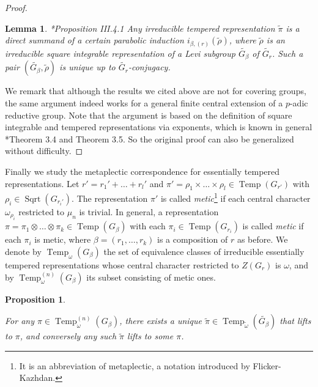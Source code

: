 \documentclass{amsart}
\numberwithin{equation}{section}
\newtheorem{proposition}[theorem]{\bf{Proposition}}
\newtheorem{lemma}[theorem]{\bf{Lemma}}
\newcommand{\mrsqrt}{\operatorname{Sqrt}}
\newcommand{\mrtemp}{\operatorname{Temp}}
\newcommand{\wt}[1]{\widetilde{#1}}
\begin{document}
\begin{proof}
		\begin{lemma}\cite{waldspurger2003formule}*{Proposition III.4.1} Any irreducible tempered representation $\wt{\pi}$ is a direct summand of a certain parabolic induction $i_{\beta,(r)}(\wt{\rho})$, where $\wt{\rho}$ is an irreducible square integrable representation of a Levi subgroup $\wt{G_{\beta}}$ of $\wt{G_{r}}$. Such a pair $(\wt{G_{\beta}},\wt{\rho})$ is unique up to $\wt{G_{r}}$-conjugacy.
			
		\end{lemma}
		
		We remark that although the results we cited above are not for covering groups, the same argument indeed works for a general finite central extension of a $p$-adic reductive group. Note that the argument is based on the definition of square integrable and tempered representations via exponents, which is known in general \cite{ban2013langlands}*{Theorem 3.4 and Theorem 3.5}. So the original proof can also be generalized without difficulty.
		
		
		
		
	\end{proof}
	
	Finally we study the metaplectic correspondence for essentially tempered representations. Let  $r'=r_{1}'+\dots+r_{l}'$ and  $\pi'=\rho_{1}\times\dots\times\rho_{l}\in\mrtemp(G_{r'})$ with $\rho_{i}\in\mrsqrt(G_{r_{i}'})$. The representation $\pi'$ is called \emph{metic}\footnote{It is an abbreviation of metaplectic, a notation introduced by Flicker-Kazhdan.} if each central character $\omega_{\rho_{i}}$ restricted to $\mu_{n}$ is trivial. In general, a representation $\pi=\pi_{1}\otimes\dots\otimes\pi_{k}\in\mrtemp(G_{\beta})$ with each $\pi_{i}\in\mrtemp(G_{r_{i}})$ is called \emph{metic} if each $\pi_{i}$ is metic, where $\beta=(r_{1},\dots,r_{k})$ is a composition of $r$ as before. We denote by $\mrtemp_{\omega}(G_{\beta})$ the set of equivalence classes of irreducible essentially tempered representations whose central character restricted to $Z(G_{r})$ is $\omega$, and by $\mrtemp^{(n)}_{\omega}(G_{\beta})$ its subset consisting of metic ones.
	
	\begin{proposition}\label{propmclifttemp}
		
		For any $\pi\in\mrtemp^{(n)}_{\omega}(G_{\beta})$, there exists a unique $\wt{\pi}\in\mrtemp_{\wt{\omega}}(\wt{G_{\beta}})$ that lifts to $\pi$, and conversely any such $\wt{\pi}$ lifts to some $\pi$.
		
	\end{proposition}
	
\end{document}
